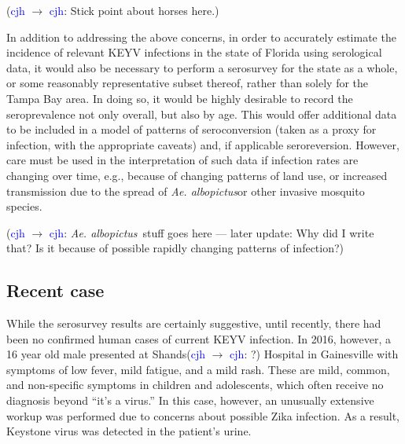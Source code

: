 \documentclass{article}
\newcommand{\alb}{\textit{Ae. albopictus}}
\newcommand{\cjh}{\textcolor{blue}{cjh}}
\newcommand{\msg}[3]{(#1 $\rightarrow$ #2: #3)}
\newcommand{\mcc}[1]{\msg\cjh\cjh{#1}}
\begin{document}
        \mcc{Stick point about horses here.}

        In addition to addressing the above concerns, in order to accurately estimate the incidence of relevant KEYV infections in the state of Florida using serological data, it would also be necessary to perform a serosurvey for the state as a whole, or some reasonably representative subset thereof, rather than solely for the Tampa Bay area. In doing so, it would be highly desirable to record the seroprevalence not only overall, but also by age. This would offer additional data to be included in a model of patterns of seroconversion (taken as a proxy for infection, with the appropriate caveats) and, if applicable seroreversion. However, care must be used in the interpretation of such data if infection rates are changing over time, e.g., because of changing patterns of land use, or increased transmission due to the spread of \alb or other invasive mosquito species.

        \mcc{\alb\ stuff goes here --- later update: Why did I write that? Is it because of possible rapidly changing patterns of infection?}

        \subsection{Recent case}
            While the serosurvey results are certainly suggestive, until recently, there had been no confirmed human cases of current KEYV infection. In 2016, however, a 16 year old male presented at Shands\mcc{?} Hospital in Gainesville with symptoms of low fever, mild fatigue, and a mild rash. These are mild, common, and non-specific symptoms in children and adolescents, which often receive no diagnosis beyond ``it's a virus.'' In this case, however, an unusually extensive workup was performed due to concerns about possible Zika infection. As a result, Keystone virus was detected in the patient's urine.\cite{asdf}
        
\end{document}
